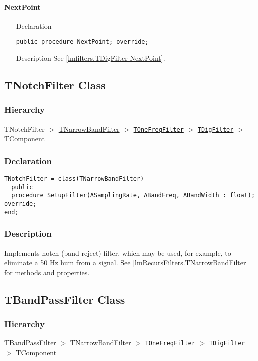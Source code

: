\documentclass[12pt,a4paper,oneside]{report}
\newcommand{\declarationitem}[1]{{\addfontfeatures{FakeSlant} #1}}
\newcommand{\descriptiontitle}[1]{{\addfontfeatures{FakeSlant}#1}}
\newcommand{\code}[1]{\texttt{#1}}
\begin{document}
\paragraph{NextPoint}
\label{lmRecursFilters.TNarrowBandFilter-NextPoint}
\begin{itemize}\item[\declarationitem{Declaration}\hfill]
	\begin{flushleft}
			\code{public procedure NextPoint; override;}
	\end{flushleft}
	\item[\descriptiontitle{Description}\hfill] See \ref{lmfilters.TDigFilter-NextPoint}.
\end{itemize}
\subsection{TNotchFilter Class}
\label{lmRecursFilters.TNotchFilter}
\subsubsection{Hierarchy}
TNotchFilter {$>$} \hyperref[lmRecursFilters.TNarrowBandFilter]{TNarrowBandFilter} {$>$} 
\hyperref[lmfilters.TOneFreqFilter]{\code{TOneFreqFilter}} {$>$} \hyperref[lmfilters.TDigFilter]{\code{TDigFilter}} {$>$} TComponent
\subsubsection{Declaration}
\begin{verbatim}
TNotchFilter = class(TNarrowBandFilter)
  public
  procedure SetupFilter(ASamplingRate, ABandFreq, ABandWidth : float); override;
end;
\end{verbatim}
\subsubsection{Description}
Implements notch (band-reject) filter, which may be used, for example, to eliminate a 50 Hz hum from a signal. See \ref{lmRecursFilters.TNarrowBandFilter} for methods and properties. 
\subsection{TBandPassFilter Class}
\label{lmRecursFilters.TBandPassFilter}
\subsubsection{Hierarchy}
TBandPassFilter {$>$} \hyperref[lmRecursFilters.TNarrowBandFilter]{TNarrowBandFilter} {$>$} 
\hyperref[lmfilters.TOneFreqFilter]{\code{TOneFreqFilter}} {$>$} \hyperref[lmfilters.TDigFilter]{\code{TDigFilter}} {$>$} TComponent
\end{document}

